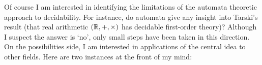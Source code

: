\documentclass{article}
\theoremstyle{plain} \numberwithin{equation}{section}
\theoremstyle{definition}
\begin{document}



Of course I am interested in identifying the limitations of the automata theoretic approach to decidability. For instance, do automata give any insight into Tarski's result (that real arithmetic $({\mathbb R},+,\times)$ has decidable first-order theory)? Although I suspect the answer is `no', only small steps have been taken in this direction. 
On the possibilities side, I am interested in applications of the central idea to other fields.
 Here are two instances at the front of my mind:
\end{document}
